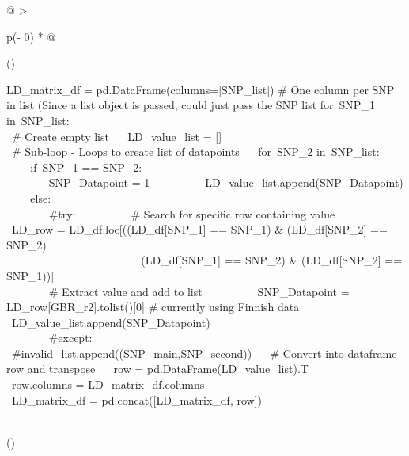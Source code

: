 \documentclass[12pt,a4paper]{article}
\begin{document}
\protect\hypertarget{t.f562ae5cedba9ec0d08c9ebb9c8653d95d6fa722}{}{}\protect\hypertarget{t.15}{}{}

\begin{longtable}[]{@{}
  >{\raggedright\arraybackslash}p{(\columnwidth - 0\tabcolsep) * }@{}}
\toprule()
\endhead
\begin{minipage}[t]{\linewidth}\raggedright
{LD\_matrix\_df = pd.DataFrame(columns={[}SNP\_list{]}) }{\# One column
per SNP in list (Since a list object is passed, could just pass the SNP
list}{\hfill\break
}{for}{~SNP\_1 }{in}{~SNP\_list:\\
\hspace*{0.333em} ~}{\# Create empty list}{\hfill\break
~ ~LD\_value\_list = {[}{]}\\
\hspace*{0.333em} ~}{\# Sub-loop - Loops to create list of
datapoints}{\hfill\break
~ ~}{for}{~SNP\_2 }{in}{~SNP\_list:\\
\hspace*{0.333em} ~ ~ ~}{if}{~SNP\_1 == SNP\_2:\\
\hspace*{0.333em} ~ ~ ~ ~ ~SNP\_Datapoint = }{1}{\hfill\break
~ ~ ~ ~ ~ ~LD\_value\_list.append(SNP\_Datapoint)\\
\hspace*{0.333em} ~ ~ ~}{else}{:\\
\hspace*{0.333em} ~ ~ ~ ~ ~}{\#try:}{\hfill\break
~ ~ ~ ~ ~ ~}{\# Search for specific row containing value}{\hfill\break
~ ~ ~ ~ ~ ~LD\_row =
LD\_df.loc{[}((LD\_df{[}}{\textquotesingle SNP\_1\textquotesingle{}}{{]}
== SNP\_1) \& (LD\_df{[}}{\textquotesingle SNP\_2\textquotesingle{}}{{]}
== SNP\_2) \textbar{}\\
\hspace*{0.333em} ~ ~ ~ ~ ~ ~ ~ ~ ~ ~ ~ ~ ~ ~
~(LD\_df{[}}{\textquotesingle SNP\_1\textquotesingle{}}{{]} == SNP\_2)
\& (LD\_df{[}}{\textquotesingle SNP\_2\textquotesingle{}}{{]} ==
SNP\_1)){]}\\
\hspace*{0.333em} ~ ~ ~ ~ ~}{\# Extract value and add to
list}{\hfill\break
~ ~ ~ ~ ~ ~SNP\_Datapoint =
LD\_row{[}}{\textquotesingle GBR\_r2\textquotesingle{}}{{]}.tolist(){[}}{0}{{]}
}{\# currently using Finnish data}{\hfill\break
~ ~ ~ ~ ~ ~LD\_value\_list.append(SNP\_Datapoint)\\
\hspace*{0.333em} ~ ~ ~ ~ ~}{\#except:}{\hfill\break
~ ~ ~ ~ ~ ~ ~
~}{\#invalid\_list.append((SNP\_main,SNP\_second))}{\hfill\break
~ ~}{\# Convert into dataframe row and transpose}{\hfill\break
~ ~row = pd.DataFrame(LD\_value\_list).T\\
\hspace*{0.333em} ~row.columns = LD\_matrix\_df.columns\\
\hspace*{0.333em} ~LD\_matrix\_df = pd.concat({[}LD\_matrix\_df,
row{]})}\strut
\end{minipage} \\
\bottomrule()
\end{longtable}
\end{document}
